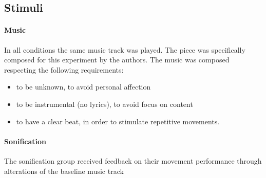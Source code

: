 \documentclass[10pt,letterpaper]{article}
\begin{document}
 

\subsection*{Stimuli}

\paragraph{Music}
In all conditions the same music track was played. The piece was specifically composed for this experiment by the authors. The music was composed respecting the following requirements:
\begin{itemize}
\item to be unknown, to avoid personal affection
\item to be instrumental (no lyrics), to avoid focus on content
\item to have a clear beat, in order to stimulate repetitive movements.
\end{itemize}

\paragraph{Sonification}

The sonification group received  feedback on their movement performance through alterations of the baseline music track
 
\end{document}
